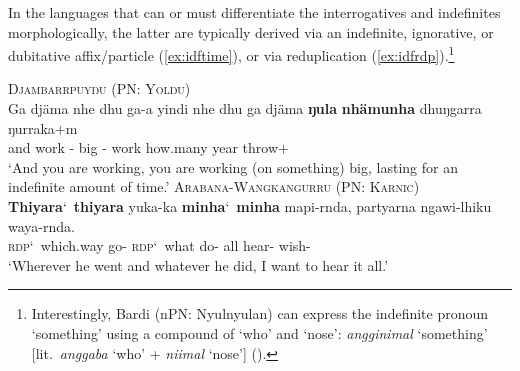 \documentclass[12pt,egregdoesnotlikesansseriftitles]{scrartcl}
\begin{document}
In the languages that can or must differentiate the interrogatives and indefinites morphologically, the latter are typically derived via an indefinite, ignorative, or dubitative affix/particle (\ref{ex:idftime}), or via reduplication (\ref{ex:idfrdp}).\footnote{Interestingly, Bardi (nPN: Nyulnyulan) can express the indefinite pronoun `something' using a compound of `who' and `nose': \textit{angginimal} `something' [lit.\ \textit{anggaba} `who' + \textit{niimal} `nose'] (\citealt[321]{bowern12}).}
\begin{exe}
  \ex\label{ex:idftime} \textsc{Djambarrpuyŋu (PN: Yolŋu)}\hfill {}\\
  \gll %
  Ga     djäma    nhe    dhu    ga-a        yindi    nhe    dhu    ga     djäma    \textbf{ŋula}        \textbf{nhämunha}    dhuŋgarra    ŋurraka$+$m\\
  and    work    \Ssg{}    \Fut{}    \Impv-\First{}    big   \Ssg{}    \Fut{}    \Impv-\First{}   work        how.many    year        throw$+$\First\\
  \glt `And you are working, you are working (on something) big, lasting for an indefinite amount of time.'
  \ex\label{ex:idfrdp} \textsc{Arabana-Wangkangurru (PN: Karnic)}\hfill {}\\
  \gll \textbf{Thiyara}\char`~\textbf{thiyara} yuka-ka \textbf{minha}\char`~\textbf{minha} mapi-rnda, partyarna ngawi-lhiku waya-rnda.\\
  \textsc{rdp}\char`~which.way go-\Pst{} \textsc{rdp}\char`~what do-\Prs{} all hear-\Purp{} wish-\Prs\\
  \glt `Wherever he went and whatever he did, I want to hear it all.' %
\end{exe}
\end{document}
